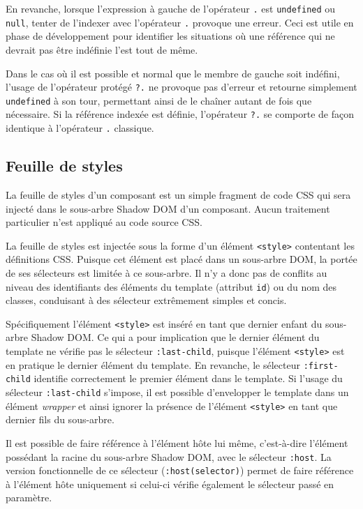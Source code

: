 En revanche, lorsque l'expression à gauche de l'opérateur \texttt{.} est \texttt{undefined} ou \texttt{null}, tenter de l'indexer avec l'opérateur \texttt{.} provoque une erreur. Ceci est utile en phase de développement pour identifier les situations où une référence qui ne devrait pas être indéfinie l'est tout de même.

Dans le cas où il est possible et normal que le membre de gauche soit indéfini, l'usage de l'opérateur protégé \texttt{?.} ne provoque pas d'erreur et retourne simplement \texttt{undefined} à son tour, permettant ainsi de le chaîner autant de fois que nécessaire. Si la référence indexée est définie, l'opérateur \texttt{?.} se comporte de façon identique à l'opérateur \texttt{.} classique.

\subsection{Feuille de styles} \label{sec:web-specs-stylesheet}
La feuille de styles d'un composant est un simple fragment de code CSS qui sera injecté dans le sous-arbre Shadow DOM d'un composant. Aucun traitement particulier n'est appliqué au code source CSS.

La feuille de styles est injectée sous la forme d'un élément \texttt{<style>} contentant les définitions CSS. Puisque cet élément est placé dans un sous-arbre DOM, la portée de ses sélecteurs est limitée à ce sous-arbre. Il n'y a donc pas de conflits au niveau des identifiants des éléments du template (attribut \texttt{id}) ou du nom des classes, conduisant à des sélecteur extrêmement simples et concis.

Spécifiquement l'élément \texttt{<style>} est inséré en tant que dernier enfant du sous-arbre Shadow DOM. Ce qui a pour implication que le dernier élément du template ne vérifie pas le sélecteur \texttt{:last-child}, puisque l'élément \texttt{<style>} est en pratique le dernier élément du template. En revanche, le sélecteur \texttt{:first-child} identifie correctement le premier élément dans le template. Si l'usage du sélecteur \texttt{:last-child} s'impose, il est possible d'envelopper le template dans un élément \emph{wrapper} et ainsi ignorer la présence de l'élément \texttt{<style>} en tant que dernier fils du sous-arbre.

Il est possible de faire référence à l'élément hôte lui même, c'est-à-dire l'élément possédant la racine du sous-arbre Shadow DOM, avec le sélecteur \texttt{:host}. La version fonctionnelle de ce sélecteur (\texttt{:host(selector)}) permet de faire référence à l'élément hôte uniquement si celui-ci vérifie également le sélecteur passé en paramètre.


